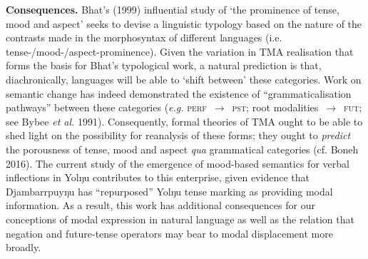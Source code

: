 \documentclass[dvipsnames,12pt]{article}%
\begin{document}
\noindent\textbf{Consequences.} Bhat's (1999) influential study of `the prominence of tense, mood and aspect' seeks to devise a linguistic typology based on the nature of the contrasts made in the morphosyntax of different languages (i.e. tense-/mood-/aspect-prominence). %
Given the variation in TMA realisation that forms the basis for Bhat's typological work, a natural prediction is that, diachronically, languages will be able to `shift between' these categories. Work on semantic change has indeed demonstrated the existence of ``grammaticalisation pathways'' between these categories (\textit{e.g.} \textsc{perf}~$ \to $~\textsc{pst}; %
root modalities~$ \to $~\textsc{fut}; see Bybee \textit{et al.} 1991). Consequently, formal theories of TMA ought to be able to shed light on the possibility for reanalysis of these forms; they ought to \textit{predict} the porousness of tense, mood and aspect \textit{qua} grammatical categories (cf. Boneh 2016). The current study of the emergence of mood-based semantics for verbal inflections in Yolŋu contributes to this enterprise, given evidence that Djambarrpuyŋu has ``repurposed'' Yolŋu tense marking as providing modal information.
As a result, this work has additional consequences for our conceptions of modal expression in natural language as well as the relation that negation and future-tense operators may bear to modal displacement more broadly.




\end{document}

